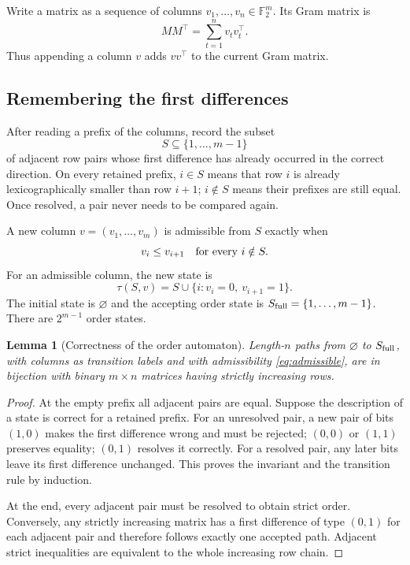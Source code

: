 \documentclass[11pt,letterpaper]{article}
\newtheorem{lemma}[theorem]{Lemma}
\theoremstyle{definition}
\newcommand{\F}{\mathbb F_2}
\newcommand{\1}{\mathbf 1}
\begin{document}
Write a matrix as a sequence of columns $v_1,\ldots,v_n\in\F^m$. Its Gram
matrix is
\begin{equation}\label{eq:gramsum}
 MM^\top=\sum_{t=1}^n v_tv_t^\top.
\end{equation}
Thus appending a column $v$ adds $vv^\top$ to the current Gram matrix.

\subsection{Remembering the first differences}
After reading a prefix of the columns, record the subset
\[
 S\subseteq\{1,\ldots,m-1\}
\]
of adjacent row pairs whose first difference has already occurred in the
correct direction. On every retained prefix, $i\in S$ means that row $i$ is
already lexicographically smaller than row $i+1$; $i\notin S$ means their
prefixes are still equal. Once resolved, a pair never needs to be compared
again.

A new column $v=(v_1,\ldots,v_m)$ is admissible from $S$ exactly when
\begin{equation}\label{eq:admissible}
 v_i\le v_{i+1}\quad\hbox{for every }i\notin S.
\end{equation}
For an admissible column, the new state is
\begin{equation}\label{eq:transition}
 \tau(S,v)=S\cup\{i:v_i=0,\ v_{i+1}=1\}.
\end{equation}
The initial state is $\varnothing$ and the accepting order state is
$S_{\rm full}=\{1,\ldots,m-1\}$. There are $2^{m-1}$ order states.

\begin{lemma}[Correctness of the order automaton]\label{lem:order}
Length-$n$ paths from $\varnothing$ to $S_{\rm full}$, with columns as transition
labels and with admissibility \eqref{eq:admissible}, are in bijection with binary
$m\times n$ matrices having strictly increasing rows.
\end{lemma}
\begin{proof}
At the empty prefix all adjacent pairs are equal. Suppose the description of a
state is correct for a retained prefix. For an unresolved pair, a new pair of
bits $(1,0)$ makes the first difference wrong and must be rejected; $(0,0)$ or
$(1,1)$ preserves equality; $(0,1)$ resolves it correctly. For a resolved pair,
any later bits leave its first difference unchanged. This proves the invariant
and the transition rule by induction.

At the end, every adjacent pair must be resolved to obtain strict order.
Conversely, any strictly increasing matrix has a first difference of type
$(0,1)$ for each adjacent pair and therefore follows exactly one accepted path.
Adjacent strict inequalities are equivalent to the whole increasing row chain.
\end{proof}
\end{document}
